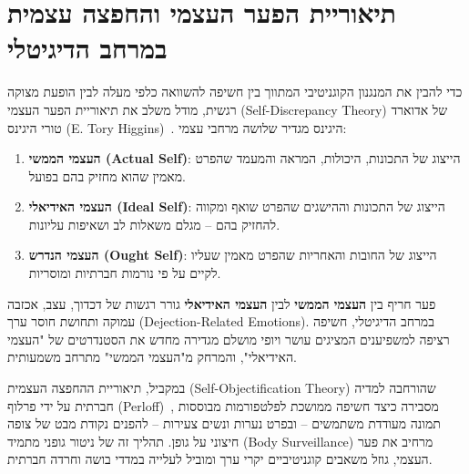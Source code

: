 \section{תיאוריית הפער העצמי והחפצה עצמית במרחב הדיגיטלי}
\label{sec:lit_self_discrepancy}
כדי להבין את המנגנון הקוגניטיבי המתווך בין חשיפה להשוואה כלפי מעלה לבין הופעת מצוקה רגשית, מודל \projectname{} משלב את תיאוריית הפער העצמי (\textenglish{Self-Discrepancy Theory}) של אדוארד טורי היגינס (\textenglish{E. Tory Higgins})~\cite{higgins1987self}. היגינס מגדיר שלושה מרחבי עצמי:
\begin{enumerate}
    \item \textbf{העצמי הממשי (\textenglish{Actual Self})}: הייצוג של התכונות, היכולות, המראה והמעמד שהפרט מאמין שהוא מחזיק בהם בפועל.
    \item \textbf{העצמי האידיאלי (\textenglish{Ideal Self})}: הייצוג של התכונות וההישגים שהפרט שואף ומקווה להחזיק בהם -- מגלם משאלות לב ושאיפות עליונות.
    \item \textbf{העצמי הנדרש (\textenglish{Ought Self})}: הייצוג של החובות והאחריות שהפרט מאמין שעליו לקיים על פי נורמות חברתיות ומוסריות.
\end{enumerate}

פער חריף בין \textbf{העצמי הממשי} לבין \textbf{העצמי האידיאלי} גורר רגשות של דכדוך, עצב, אכזבה עמוקה ותחושת חוסר ערך (\textenglish{Dejection-Related Emotions}). במרחב הדיגיטלי, חשיפה רציפה למשפיענים המציגים עושר ויופי מושלם מגדירה מחדש את הסטנדרטים של "העצמי האידיאלי", והמרחק מ"העצמי הממשי" מתרחב משמעותית.

במקביל, תיאוריית ההחפצה העצמית (\textenglish{Self-Objectification Theory}) שהורחבה למדיה חברתית על ידי פרלוף (\textenglish{Perloff})~\cite{perloff2014social}, מסבירה כיצד חשיפה ממושכת לפלטפורמות מבוססות תמונה מעודדת משתמשים -- ובפרט נערות ונשים צעירות -- להפנים נקודת מבט של צופה חיצוני על גופן. תהליך זה של ניטור גופני מתמיד (\textenglish{Body Surveillance}) מרחיב את פער העצמי, גוזל משאבים קוגניטיביים יקרי ערך ומוביל לעלייה במדדי בושה וחרדה חברתית.

